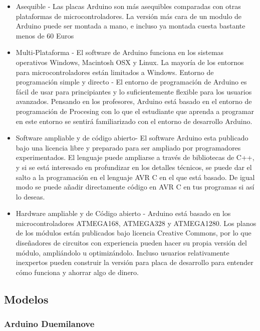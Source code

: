 \documentclass[12pt,a4paper]{report}
\begin{document}
\begin{itemize} 
    \item Asequible - Las placas Arduino son más asequibles comparadas con
    otras plataformas de microcontroladores. La versión más cara de un modulo
    de Arduino puede ser montada a mano, e incluso ya montada cuesta bastante
    menos de 60 Euros
    
    \item Multi-Plataforma - El software de Arduino funciona en los sistemas
    operativos Windows, Macintosh OSX y Linux. La mayoría de los entornos para
    microcontroladores están limitados a Windows.
    Entorno de programación simple y directo - El entorno de programación de Arduino
    es fácil de usar para principiantes y lo suficientemente flexible para los
    usuarios avanzados. Pensando en los profesores, Arduino está basado en el
    entorno de programación de Procesing con lo que el estudiante que aprenda a
    programar en este entorno se sentirá familiarizado con el entorno de desarrollo
    Arduino.

    \item Software ampliable y de código abierto- El software Arduino esta
    publicado bajo una licencia libre y preparado para ser ampliado por
    programadores experimentados. El lenguaje puede ampliarse a través de
    bibliotecas de C++, y si se está interesado en profundizar en los detalles
    técnicos, se puede dar el salto a la programación en el lenguaje AVR C en el
    que está basado. De igual modo se puede añadir directamente código en AVR C
    en tus programas si así lo deseas.
	
    \item Hardware ampliable y de Código abierto - Arduino está basado en los
    microcontroladores ATMEGA168, ATMEGA328 y ATMEGA1280. Los planos de los
    módulos están publicados bajo licencia Creative Commons, por lo que
    diseñadores de circuitos con experiencia pueden hacer su propia versión del
    módulo, ampliándolo u optimizándolo. Incluso usuarios relativamente
    inexpertos pueden construir la versión para placa de desarrollo para
    entender cómo funciona y ahorrar algo de dinero.
\end{itemize}

\subsection{Modelos}
\subsubsection{Arduino Duemilanove}
\end{document}
